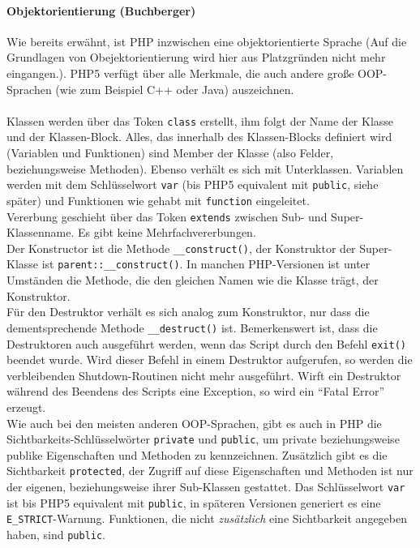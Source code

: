 \paragraph{Objektorientierung (Buchberger)\\}
Wie bereits erwähnt, ist PHP inzwischen eine objektorientierte Sprache (Auf die Grundlagen von Obejektorientierung wird hier aus Platzgründen nicht mehr eingangen.).
PHP5 verfügt über alle Merkmale, die auch andere große OOP-Sprachen (wie zum Beispiel C++ oder Java) auszeichnen.\\
\\
Klassen werden über das Token \texttt{class} erstellt, ihm folgt der Name der Klasse und der Klassen-Block. Alles, das innerhalb des Klassen-Blocks definiert wird (Variablen und Funktionen) sind Member der Klasse (also Felder, beziehungsweise Methoden). Ebenso verhält es sich mit Unterklassen. Variablen werden mit dem Schlüsselwort \texttt{var} (bis PHP5 equivalent mit \texttt{public}, siehe später) und Funktionen wie gehabt mit \texttt{function} eingeleitet.\\
Vererbung geschieht über das Token \texttt{extends} zwischen Sub- und Super-Klassenname. Es gibt keine Mehrfachvererbungen.\\
Der Konstructor ist die Methode \texttt{\_\_construct()}, der Konstruktor der Super-Klasse ist \texttt{parent::\_\_construct()}. In manchen PHP-Versionen ist unter Umständen die Methode, die den gleichen Namen wie die Klasse trägt, der Konstruktor.\\
Für den Destruktor verhält es sich analog zum Konstruktor, nur dass die dementsprechende Methode \texttt{\_\_destruct()} ist. Bemerkenswert ist, dass die Destruktoren auch ausgeführt werden, wenn das Script durch den Befehl \texttt{exit()} beendet wurde. Wird dieser Befehl in einem Destruktor aufgerufen, so werden die verbleibenden Shutdown-Routinen nicht mehr ausgeführt. Wirft ein Destruktor während des Beendens des Scripts eine Exception, so wird ein \enquote{Fatal Error} erzeugt.\\
Wie auch bei den meisten anderen OOP-Sprachen, gibt es auch in PHP die Sichtbarkeits-Schlüsselwörter \texttt{private} und \texttt{public}, um private beziehungsweise publike Eigenschaften und Methoden zu kennzeichnen. Zusätzlich gibt es die Sichtbarkeit \texttt{protected}, der Zugriff auf diese Eigenschaften und Methoden ist nur der eigenen, beziehungsweise ihrer Sub-Klassen gestattet. Das Schlüsselwort \texttt{var} ist bis PHP5 equivalent mit \texttt{public}, in späteren Versionen generiert es eine \texttt{E\_STRICT}-Warnung. Funktionen, die nicht \textit{zusätzlich} eine Sichtbarkeit angegeben haben, sind \texttt{public}.\\
